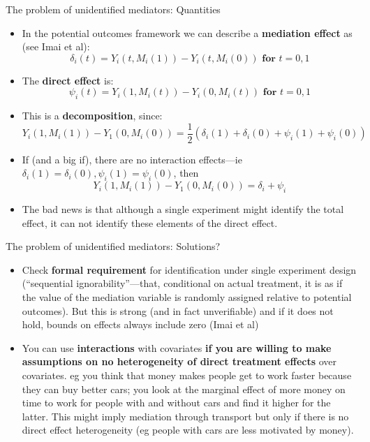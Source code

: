 \documentclass[
  11pt,
  ignorenonframetext,
]{beamer}
\providecommand{\tightlist}{%
  \setlength{\itemsep}{0pt}\setlength{\parskip}{0pt}}\usepackage{longtable,booktabs,array}
\begin{document}
\begin{frame}{The problem of unidentified mediators: Quantities}
\protect\hypertarget{the-problem-of-unidentified-mediators-quantities}{}
\begin{itemize}
\tightlist
\item
  In the potential outcomes framework we can describe a
  \textbf{mediation effect} as (see Imai et al):
  \[\delta_i(t) = Y_i(t, M_i(1)) - Y_i(t, M_i(0)) \textbf{ for } t = 0,1\]
\item
  The \textbf{direct effect} is:
  \[\psi_i(t) = Y_i(1, M_i(t)) - Y_i(0, M_i(t)) \textbf{ for } t = 0,1\]
\item
  This is a \textbf{decomposition}, since:
  \[Y_i(1, M_i(1))  - Y_1(0, M_i(0)) = \frac{1}{2}(\delta_i(1) + \delta_i(0) + \psi_i(1) + \psi_i(0))  \]
\item
  If (and a big if), there are no interaction effects---ie
  \(\delta_i(1) = \delta_i(0), \psi_i(1) = \psi_i(0)\), then
  \[Y_i(1, M_i(1))  - Y_1(0, M_i(0)) = \delta_i  + \psi_i\]
\item
  The bad news is that although a single experiment might identify the
  total effect, it can not identify these elements of the direct effect.
\end{itemize}
\end{frame}

\begin{frame}{The problem of unidentified mediators: Solutions?}
\protect\hypertarget{the-problem-of-unidentified-mediators-solutions}{}
\begin{itemize}
\tightlist
\item
  Check \textbf{formal requirement} for identification under single
  experiment design (``sequential ignorability''---that, conditional on
  actual treatment, it is as if the value of the mediation variable is
  randomly assigned relative to potential outcomes). But this is strong
  (and in fact unverifiable) and if it does not hold, bounds on effects
  always include zero (Imai et al)
\item
  You can use \textbf{interactions} with covariates \textbf{if you are
  willing to make assumptions on no heterogeneity of direct treatment
  effects} over covariates. eg you think that money makes people get to
  work faster because they can buy better cars; you look at the marginal
  effect of more money on time to work for people with and without cars
  and find it higher for the latter. This might imply mediation through
  transport but only if there is no direct effect heterogeneity (eg
  people with cars are less motivated by money).
\end{itemize}
\end{frame}
\end{document}
